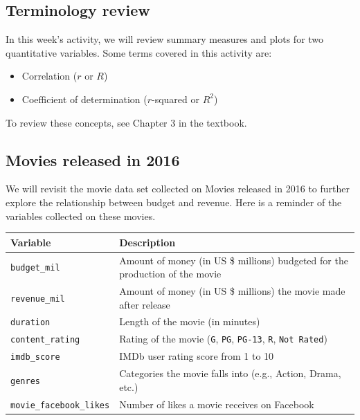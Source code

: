 \documentclass[
]{report}
\begin{document}
\hypertarget{terminology-review-10}{%
\subsection{Terminology review}\label{terminology-review-10}}

In this week's activity, we will review summary measures and plots for two quantitative variables. Some terms covered in this activity are:

\begin{itemize}
\item
  Correlation (\(r\) or \(R\))
\item
  Coefficient of determination (\(r\)-squared or \(R^2\))
\end{itemize}

To review these concepts, see Chapter 3 in the textbook.

\hypertarget{movies-released-in-2016-3}{%
\subsection{Movies released in 2016}\label{movies-released-in-2016-3}}

We will revisit the movie data set collected on Movies released in 2016 to further explore the relationship between budget and revenue. Here is a reminder of the variables collected on these movies.

\begin{longtable}[]{@{}
  >{\raggedright\arraybackslash}p{}
  >{\raggedright\arraybackslash}p{}@{}}
\toprule
\textbf{Variable} & \textbf{Description} \\
\midrule
\endhead
\texttt{budget\_mil} & Amount of money (in US \$ millions) budgeted for the production of the movie \\
\texttt{revenue\_mil} & Amount of money (in US \$ millions) the movie made after release \\
\texttt{duration} & Length of the movie (in minutes) \\
\texttt{content\_rating} & Rating of the movie (\texttt{G}, \texttt{PG}, \texttt{PG-13}, \texttt{R}, \texttt{Not\ Rated}) \\
\texttt{imdb\_score} & IMDb user rating score from 1 to 10 \\
\texttt{genres} & Categories the movie falls into (e.g., Action, Drama, etc.) \\
\texttt{movie\_facebook\_likes} & Number of likes a movie receives on Facebook \\
\bottomrule
\end{longtable}
\end{document}
